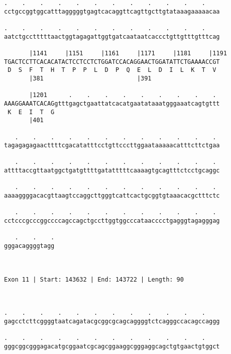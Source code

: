 \documentclass{article}
\begin{document}
\begin{Verbatim}
.    .    .    .    .    .    .    .    .    .    .    .    
cctgccggtggcatttagggggtgagtcacaggttcagttgcttgtataaagaaaaacaa
                                                            
.    .    .    .    .    .    .    .    .    .    .    .    
aatctgcctttttaactggtagagattggtgatcaataatcaccctgttgtttgtttcag
                                                            
       |1141     |1151     |1161     |1171     |1181     |1191
TGACTCCTTCACACATACTCCTCCTCTGGATCCACAGGAACTGGATATTCTGAAAACCGT
 D  S  F  T  H  T  P  P  L  D  P  Q  E  L  D  I  L  K  T  V 
       |381                          |391                   
  
       |1201      .    .    .    .    .    .    .    .    . 
AAAGGAAATCACAGgtttgagctgaattatcacatgaatataaatgggaaatcagtgttt
 K  E  I  T  G                                              
       |401                                                 
  
   .    .    .    .    .    .    .    .    .    .    .    . 
tagagagagaacttttcgacatatttcctgttcccttggaataaaaacatttcttctgaa
                                                            
   .    .    .    .    .    .    .    .    .    .    .    . 
attttaccgttaatggctgatgttttgatatttttcaaaagtgcagtttctcctgcaggc
                                                            
   .    .    .    .    .    .    .    .    .    .    .    . 
aaaaggggacacgttaagtccaggcttgggtcattcactgcggtgtaaacacgctttctc
                                                            
   .    .    .    .    .    .    .    .    .    .    .    . 
cctcccgcccggccccagccagctgccttggtggcccataacccctgagggtagagggag
                                                            
   .    .    .
gggacaggggtagg
              
              
 
Exon 11 | Start: 143632 | End: 143722 | Length: 90



.    .    .    .    .    .    .    .    .    .    .    .    
gagcctcttcggggtaatcagatacgcggcgcagcaggggtctcagggccacagccaggg
                                                            
.    .    .    .    .    .    .    .    .    .    .    .    
gggcggcgggagacatgcggaatcgcagcggaaggcgggaggcagctgtgaactgtggct
                                                            

\end{Verbatim}
\end{document}
